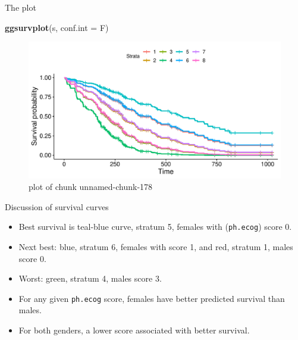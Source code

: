 \documentclass[ignorenonframetext,]{beamer}
\newenvironment{Shaded}{\begin{snugshade}}{\end{snugshade}}
\newcommand{\DataTypeTok}[1]{\textcolor[rgb]{0.13,0.29,0.53}{#1}}
\newcommand{\KeywordTok}[1]{\textcolor[rgb]{0.13,0.29,0.53}{\textbf{#1}}}
\newcommand{\NormalTok}[1]{#1}
\begin{document}
\begin{frame}[fragile]{The plot}
\protect\hypertarget{the-plot-4}{}

\begin{Shaded}
\begin{Highlighting}[]
\KeywordTok{ggsurvplot}\NormalTok{(s, }\DataTypeTok{conf.int =}\NormalTok{ F)}
\end{Highlighting}
\end{Shaded}

\begin{figure}
\centering
\includegraphics{figure/unnamed-chunk-178-1.pdf}
\caption{plot of chunk unnamed-chunk-178}
\end{figure}

\end{frame}

\begin{frame}[fragile]{Discussion of survival curves}
\protect\hypertarget{discussion-of-survival-curves}{}

\begin{itemize}
\item
  Best survival is teal-blue curve, stratum 5, females with
  (\texttt{ph.ecog}) score 0.
\item
  Next best: blue, stratum 6, females with score 1, and red, stratum 1,
  males score 0.
\item
  Worst: green, stratum 4, males score 3.
\item
  For any given \texttt{ph.ecog} score, females have better predicted
  survival than males.
\item
  For both genders, a lower score associated with better survival.
\end{itemize}

\end{frame}
\end{document}
